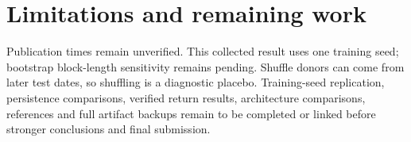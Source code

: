 \documentclass[11pt]{article}
\begin{document}
\section{Limitations and remaining work}
Publication times remain unverified. This collected result uses one training
seed; bootstrap block-length sensitivity remains pending. Shuffle donors can
come from later test dates, so shuffling is a diagnostic placebo. Training-seed
replication, persistence comparisons, verified return results, architecture
comparisons, references and full artifact backups remain to be completed or
linked before stronger conclusions and final submission.
\end{document}
